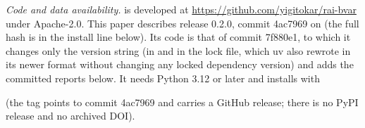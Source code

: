 \emph{Code and data availability.}
 is developed at \url{https://github.com/yigitokar/rai-bvar} under Apache-2.0.
This paper describes release 0.2.0, commit 4ac7969 on  (the full hash is in the
install line below). Its code is that of commit 7f880e1, to which it changes only the version string (in
 and in the lock file, which uv also rewrote in its newer format without
changing any locked dependency version) and adds the committed reports below. It needs Python 3.12
or later and installs with
\begin{center}\footnotesize
\mbox{}
\end{center}
(the tag  points to commit 4ac7969 and carries a GitHub release; there is no PyPI release
and no archived DOI).
